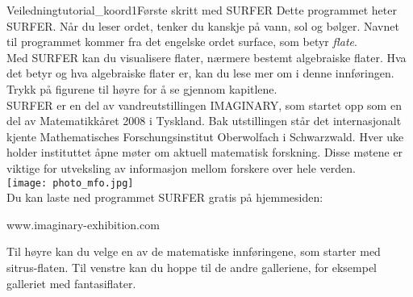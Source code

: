 \begin{surferIntroPage}{Veiledning}{tutorial_koord1}{Første skritt med SURFER}
 Dette programmet heter SURFER. Når du leser ordet, tenker du kanskje på vann, sol og bølger. 
 Navnet til programmet kommer fra det engelske ordet surface, som betyr {\it flate}. 
\\
Med SURFER kan du visualisere flater, nærmere bestemt algebraiske flater. Hva det betyr og 
hva algebraiske flater er, kan du lese mer om i denne innføringen. Trykk på figurene til 
høyre for å se gjennom kapitlene.\\

SURFER er en del av vandreutstillingen IMAGINARY, som startet opp som en del av Matematikkåret
 2008 i Tyskland. Bak utstillingen står det internasjonalt kjente Mathematisches Forschungsinstitut 
 Oberwolfach i Schwarzwald. Hver uke holder instituttet åpne møter om aktuell matematisk forskning.
 Disse møtene er viktige for utveksling av informasjon mellom forskere over hele verden.\\
 
\vspace{0.2cm} \hspace{3.5cm}\texttt{[image: photo\_mfo.jpg]}\\
Du kan laste ned programmet SURFER gratis på hjemmesiden: \\
\begin{centering}
www.imaginary-exhibition.com\\
\end{centering}
 \vspace{0.2cm}
Til høyre kan du velge en av de matematiske innføringene, som starter med sitrus-flaten.
 Til venstre kan du hoppe til de andre galleriene, for eksempel galleriet med fantasiflater.
\end{surferIntroPage}
